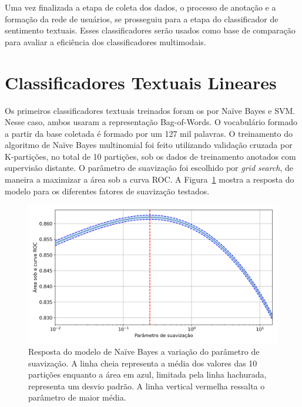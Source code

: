 Uma vez finalizada a etapa de coleta dos dados, o processo de anotação e a
formação da rede de usuários, se prosseguiu para a etapa do classificador de
sentimento textuais.
Esses classificadores serão usados como base de comparação para avaliar a
eficiência dos classificadores multimodais.

\section{Classificadores Textuais Lineares}

Os primeiros classificadores textuais treinados foram os por Naïve Bayes e SVM.
Nesse caso, ambos usaram a representação Bag-of-Words.
O vocabulário formado a partir da base coletada é formado por um 127 mil
palavras.
O treinamento do algoritmo de Naïve Bayes multinomial foi feito utilizando
validação cruzada por K-partições, no total de 10 partições, sob os dados de
treinamento anotados com supervisão distante. O parâmetro de suavização foi
escolhido por \textit{grid search}, de maneira a maximizar a área sob a curva ROC.
A Figura~\ref{fig:nb_grid} mostra a resposta do modelo para os diferentes fatores
de suavização testados.

\begin{figure}[h!]
\begin{center} {
    \begin{center}
    \includegraphics[scale=0.65]{images/nb_grid.png}
    \caption{Resposta do modelo de Naïve Bayes a variação do parâmetro de suavização.
             A linha cheia representa a média dos valores das 10 partições
             enquanto a área em azul, limitada pela linha hachurada, representa um desvio padrão.
             A linha vertical vermelha ressalta o parâmetro de maior média.}
    \label{fig:nb_grid}
    \end{center}
}
\end{center}
\end{figure}

